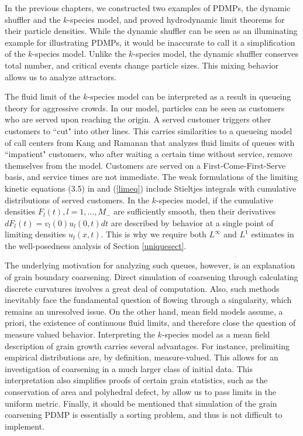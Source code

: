 In the previous chapters, we constructed two examples of PDMPs, the dynamic shuffler and the $k$-species model, and proved hydrodynamic limit theorems for their particle densities. While the dynamic shuffler can be seen as an illuminating example for illustrating PDMPs, it would be inaccurate to call it a simplification of the $k$-species model.   Unlike the $k$-species model, the dynamic shuffler conserves total number, and critical events change particle sizes.  This  mixing  behavior allows us to analyze attractors. 




The fluid limit of the $k$-species model can be interpreted as a result in queueing theory for aggressive crowds.  In our model, particles can be seen as customers who are served upon reaching the origin. A served customer triggers other customers to ``cut" into other lines. This carries similarities to a queueing model of call centers from Kang and Ramanan \cite{kang2010fluid} that analyzes fluid limits of queues with ``impatient" customers, who after waiting a certain time without service, remove themselves from the model. Customers  are served on a First-Come-First-Serve basis, and service times are not immediate. The weak formulations of the limiting kinetic equations (3.5) in \cite{kang2010fluid} and (\ref{limeq}) include Stieltjes integrals with cumulative distributions of served customers. In the $k$-species model, if the cumulative densities $F_l(t), l= 1, \dots, M_-$ are sufficiently smooth, then their derivatives $dF_l(t) = v_l(0)u_l(0,t)dt$ are described by  behavior at a single point of limiting densities $u_l(x,t)$.  This is why we require both $L^\infty$ and $L^1$ estimates in the well-posedness analysis of Section  \ref{uniquesect}.     

     The underlying motivation for analyzing such queues, however, is an explanation of grain boundary coarsening.  Direct simulation of coarsening through calculating discrete curvatures involves a great deal of computation.  Also, such methods  inevitably face the fundamental question of flowing through a singularity, which remains an unresolved issue.  On the other hand, mean field models assume, a priori, the existence of continuous fluid limits, and therefore close the question of measure valued behavior. Interpreting the $k$-species model as a mean field description of grain growth carries several advantages.  For instance, prelimiting empirical distributions are, by definition, measure-valued.  This allows for an investigation of coarsening in a much larger class of initial data.  This interpretation also simplifies proofs of certain grain statistics, such as the conservation of area and polyhedral defect, by allow us to pass limits in the uniform metric.  Finally, it should be mentioned that simulation of the grain coarsening PDMP is essentially a sorting problem, and thus is not difficult to implement. 

